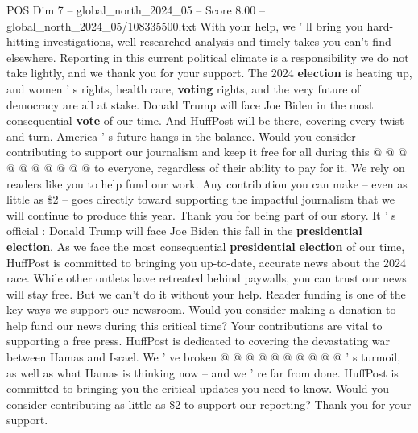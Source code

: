 \begin{textsample}{POS Dim 7 – global\_north\_2024\_05 – Score 8.00 – global\_north\_2024\_05/108335500.txt}
With your help, we ' ll bring you hard-hitting investigations, well-researched analysis and timely takes you can't find elsewhere.
Reporting in this current political climate is a responsibility we do not take lightly, and we thank you for your support.
The 2024 \textbf{election} is heating up, and women ' s rights, health care, \textbf{voting} rights, and the very future of democracy are all at stake.
Donald Trump will face Joe Biden in the most consequential \textbf{vote} of our time.
And HuffPost will be there, covering every twist and turn.
America ' s future hangs in the balance.
Would you consider contributing to support our journalism and keep it free for all during this @ @ @ @ @ @ @ @ @ @ to everyone, regardless of their ability to pay for it.
We rely on readers like you to help fund our work.
Any contribution you can make -- even as little as \$2 -- goes directly toward supporting the impactful journalism that we will continue to produce this year.
Thank you for being part of our story.
It ' s official : Donald Trump will face Joe Biden this fall in the \textbf{presidential} \textbf{election}.
As we face the most consequential \textbf{presidential} \textbf{election} of our time, HuffPost is committed to bringing you up-to-date, accurate news about the 2024 race.
While other outlets have retreated behind paywalls, you can trust our news will stay free.
But we can't do it without your help.
Reader funding is one of the key ways we support our newsroom.
Would you consider making a donation to help fund our news during this critical time?
Your contributions are vital to supporting a free press.
HuffPost is dedicated to covering the devastating war between Hamas and Israel.
We ' ve broken @ @ @ @ @ @ @ @ @ @ ' s turmoil, as well as what Hamas is thinking now -- and we ' re far from done.
HuffPost is committed to bringing you the critical updates you need to know.
Would you consider contributing as little as \$2 to support our reporting?
Thank you for your support.

\end{textsample}
